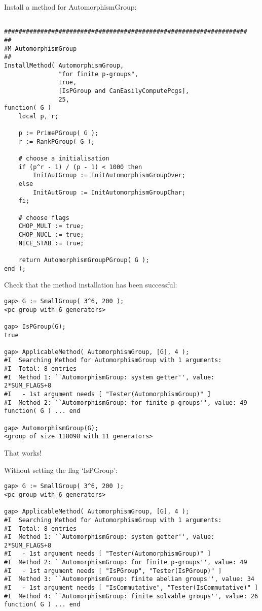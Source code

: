 \documentclass{slides}
\begin{document}
Install a method for AutomorphismGroup: \\

{\tiny \begin{verbatim}

###################################################################
##
#M AutomorphismGroup
##
InstallMethod( AutomorphismGroup,
               "for finite p-groups",
               true,
               [IsPGroup and CanEasilyComputePcgs],
               25,
function( G )
    local p, r;

    p := PrimePGroup( G );
    r := RankPGroup( G );

    # choose a initialisation
    if (p^r - 1) / (p - 1) < 1000 then
        InitAutGroup := InitAutomorphismGroupOver;
    else
        InitAutGroup := InitAutomorphismGroupChar;
    fi;

    # choose flags
    CHOP_MULT := true;
    CHOP_NUCL := true;
    NICE_STAB := true;

    return AutomorphismGroupPGroup( G );
end );

\end{verbatim}}
\newpage


Check that the method installation has been successful: \\

{\tiny \begin{verbatim}
gap> G := SmallGroup( 3^6, 200 ); 
<pc group with 6 generators>

gap> IsPGroup(G);
true

gap> ApplicableMethod( AutomorphismGroup, [G], 4 );
#I  Searching Method for AutomorphismGroup with 1 arguments:
#I  Total: 8 entries
#I  Method 1: ``AutomorphismGroup: system getter'', value: 2*SUM_FLAGS+8
#I   - 1st argument needs [ "Tester(AutomorphismGroup)" ]
#I  Method 2: ``AutomorphismGroup: for finite p-groups'', value: 49
function( G ) ... end

gap> AutomorphismGroup(G);
<group of size 118098 with 11 generators>
\end{verbatim}}

That works!
\newpage

Without setting the flag `IsPGroup': \\

{\tiny \begin{verbatim}
gap> G := SmallGroup( 3^6, 200 );
<pc group with 6 generators>

gap> ApplicableMethod( AutomorphismGroup, [G], 4 );
#I  Searching Method for AutomorphismGroup with 1 arguments:
#I  Total: 8 entries
#I  Method 1: ``AutomorphismGroup: system getter'', value: 2*SUM_FLAGS+8
#I   - 1st argument needs [ "Tester(AutomorphismGroup)" ]
#I  Method 2: ``AutomorphismGroup: for finite p-groups'', value: 49
#I   - 1st argument needs [ "IsPGroup", "Tester(IsPGroup)" ]
#I  Method 3: ``AutomorphismGroup: finite abelian groups'', value: 34
#I   - 1st argument needs [ "IsCommutative", "Tester(IsCommutative)" ]
#I  Method 4: ``AutomorphismGroup: finite solvable groups'', value: 26
function( G ) ... end
\end{verbatim}}

\end{document}
